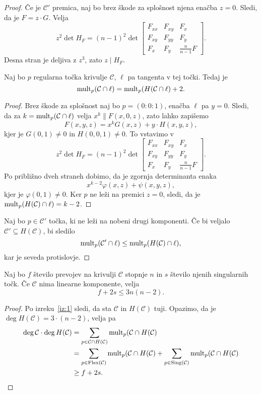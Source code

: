 \begin{proof}
Če je $\mathcal{C}'$ premica, naj bo brez škode za splošnost njena
enačba $z=0$. Sledi, da je $F = z \cdot G$. Velja
\[
z^2 \det H_F =
(n-1)^2 \det \begin{bmatrix}
F_{xx} & F_{xy} & F_x             \\
F_{xy} & F_{yy} & F_y             \\
F_x    & F_y    & \frac{n}{n-1} F
\end{bmatrix}.
\]
Desna stran je deljiva z $z^3$, zato $z \mid H_F$.

\begin{lema*}
Naj bo $p$ regularna točka krivulje $\mathcal{C}$, $\ell$ pa
tangenta v tej točki. Tedaj je
\[
\operatorname{mult}_p(\mathcal{C} \cap \ell) =
\operatorname{mult}_p(H(\mathcal{C} \cap \ell) + 2.
\]
\end{lema*}

\begin{proof}
Brez škode za splošnost naj bo $p = (0 : 0 : 1)$, enačba $\ell$ pa
$y = 0$. Sledi, da za $k = \operatorname{mult}_p(\mathcal{C} \cap \ell)$ velja
$x^k \parallel F(x, 0, z)$, zato lahko zapišemo
\[
F(x,y,z) = x^k G(x,z) + y \cdot H(x,y,z),
\]
kjer je $G(0,1) \ne 0$ in $H(0,0,1) \ne 0$. To vstavimo v
\[
z^2 \det H_F =
(n-1)^2 \det \begin{bmatrix}
F_{xx} & F_{xy} & F_x             \\
F_{xy} & F_{yy} & F_y             \\
F_x    & F_y    & \frac{n}{n-1} F
\end{bmatrix}.
\]
Po približno dveh straneh dobimo, da je zgornja determinanta enaka
\[
x^{k-2} \varphi(x,z) + \psi(x,y,z),
\]
kjer je $\varphi(0,1) \ne 0$. Ker $p$ ne leži na premici $z=0$,
sledi, da je $\operatorname{mult}_p(H(\mathcal{C}) \cap \ell) = k-2$.
\end{proof}

Naj bo $p \in \mathcal{C}'$ točka, ki ne leži na nobeni drugi
komponenti. Če bi veljalo $\mathcal{C}' \subseteq H(\mathcal{C})$,
bi sledilo
\[
\operatorname{mult}_p(\mathcal{C}' \cap \ell) \leq
\operatorname{mult}_p(H(\mathcal{C}) \cap \ell),
\]
kar je seveda protislovje.
\end{proof}

\begin{trditev}
Naj bo $f$ število prevojev na krivulji $\mathcal{C}$ stopnje $n$
in $s$ število njenih singularnih točk. Če $\mathcal{C}$ nima
linearne komponente, velja
\[
f + 2s \leq 3n(n-2).
\]
\end{trditev}

\begin{proof}
Po izreku~\ref{iz:1} sledi, da sta $\mathcal{C}$ in
$H(\mathcal{C})$ tuji. Opazimo, da je
$\deg H(\mathcal{C}) = 3 \cdot (n-2)$, velja pa
\begin{align*}
\deg \mathcal{C} \cdot \deg H(\mathcal{C})
&=
\sum_{p \in \mathcal{C} \cap H(\mathcal{C})}
\operatorname{mult}_p(\mathcal{C} \cap H(\mathcal{C})
\\
&=
\sum_{p \in \operatorname{Flex}(\mathcal{C})}
\operatorname{mult}_p(\mathcal{C} \cap H(\mathcal{C}) +
\sum_{p \in \operatorname{Sing}(\mathcal{C})}
\operatorname{mult}_p(\mathcal{C} \cap H(\mathcal{C})
\\
&\geq
f + 2s. \qedhere
\end{align*}
\end{proof}
